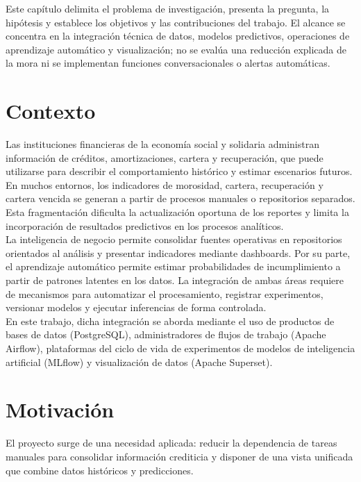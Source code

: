 Este capítulo delimita el problema de investigación, presenta la pregunta, la hipótesis y establece los objetivos y las contribuciones del trabajo. El alcance se concentra en la integración técnica de datos, modelos predictivos, operaciones de aprendizaje automático y visualización; no se evalúa una reducción explicada de la mora ni se implementan funciones conversacionales o alertas automáticas.

\section{Contexto}

Las instituciones financieras de la economía social y solidaria administran información de créditos, amortizaciones, cartera y recuperación, que puede utilizarse para describir el comportamiento histórico y estimar escenarios futuros. En muchos entornos, los indicadores de morosidad, cartera, recuperación y cartera vencida se generan a partir de procesos manuales o repositorios separados. Esta fragmentación dificulta la actualización oportuna de los reportes y limita la incorporación de resultados predictivos en los procesos analíticos.\\

La inteligencia de negocio permite consolidar fuentes operativas en repositorios orientados al análisis y presentar indicadores mediante dashboards. Por su parte, el aprendizaje automático permite estimar probabilidades de incumplimiento a partir de patrones latentes en los datos. La integración de ambas áreas requiere de mecanismos para automatizar el procesamiento, registrar experimentos, versionar modelos y ejecutar inferencias de forma controlada.\\

En este trabajo, dicha integración se aborda mediante el uso de productos de bases de datos (PostgreSQL), administradores de flujos de trabajo (Apache Airflow), plataformas del ciclo de vida de experimentos de modelos de inteligencia artificial (MLflow) y visualización de datos (Apache Superset).

\section{Motivación}

El proyecto surge de una necesidad aplicada: reducir la dependencia de tareas manuales para consolidar información crediticia y disponer de una vista unificada que combine datos históricos y predicciones.\\

